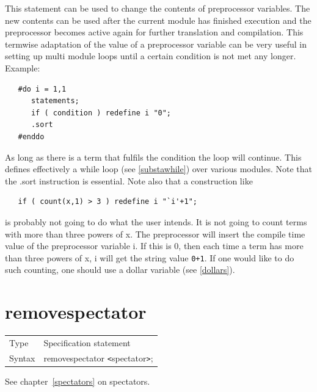\noindent This statement can be used to change the contents 
of preprocessor 
variables. The new contents can be used after 
the current module has finished execution and the preprocessor becomes 
active again for further translation and compilation. 
This termwise adaptation of the value of a preprocessor variable can be 
very useful in setting up multi module loops until a certain condition is 
not met any longer. Example:
\begin{verbatim}
   #do i = 1,1
      statements;
      if ( condition ) redefine i "0";
      .sort
   #enddo
\end{verbatim}
As long as there is a term that fulfils the condition the loop 
will continue. This defines effectively a while loop (see 
\ref{substawhile}) over various modules. Note that the .sort 
instruction is essential. Note also that a construction like
\begin{verbatim}
   if ( count(x,1) > 3 ) redefine i "`i'+1";
\end{verbatim}
is probably not going to do what the user intends. It is not going to count 
terms with more than three powers of x. The preprocessor will insert the 
compile time value of the preprocessor variable i. If this is 0, then each 
time a term has more than three powers of x, i will get the string value 
\verb:0+1:. If one would like to do such counting, one should use a 
dollar variable (see \ref{dollars}). \vspace{10mm}


\section{removespectator}
\label{substaremovespectator}

\noindent \begin{tabular}{ll}
Type & Specification statement\\
Syntax & removespectator {\tt<}spectator{\tt>};
\end{tabular} \vspace{4mm}

\noindent See chapter~\ref{spectators} on spectators.
\vspace{10mm}


